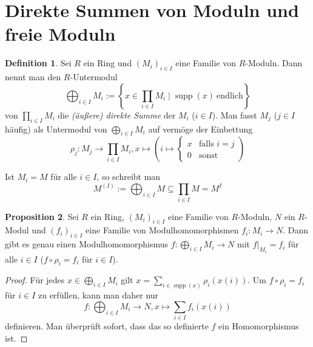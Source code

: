 \documentclass[
twoside=semi,
fontsize=12,
DIV=12, 
cleardoublepage=current,
leqno,
headings=optiontoheadandtoc, 
toc=idx
]{scrbook}
\newcommand{\brac}[1]{\left( #1 \right)}
\newcommand{\set}[1]{\left\{ #1 \right\}}
\DeclareMathOperator{\supp}{supp}
\theoremstyle{definition}
\newtheorem{definition}{Definition}[section]
\newtheorem{proposition}[definition]{Proposition}
\begin{document}
	\section{Direkte Summen von Moduln und freie Moduln}\thispagestyle{sectionstart}
	\begin{definition}\label{1.2.1}\hfill\newline
		Sei $R$ ein Ring und $(M_i)_{i \in I}$ eine Familie von $R$-Moduln. Dann nennt man den \linebreak$R$-Untermodul 
			\[\bigoplus_{i \in I} M_i := \set{x \in \prod_{i\in I}M_i \mid \supp(x)\ \mathrm{endlich} } \]
		von $\displaystyle\prod_{i\in I} M_i$ die \emph{(\"au\ss ere) direkte Summe} der $M_i$ ($i \in I$). Man fasst $M_j$ ($j \in I$ h\"aufig) als Untermodul von $\displaystyle\bigoplus_{i \in I} M_i$ auf verm\"oge der Einbettung 
		 \[\rho_j:M_j \to \prod_{i\in I} M_i, x \mapsto \brac{i \mapsto \begin{cases}
		 		x & \textrm{falls } i = j\\
		 		0 & \textrm{sonst}
		 \end{cases}}\] 
	 	
	 	\noindent Ist $M_i = M$ f\"ur alle $i \in I$, so schreibt man \[M^{(I)} := \bigoplus_{i \in I} M \subseteq \prod_{i\in I} M = M^I\]
	\end{definition}
	
	\begin{proposition}\label{1.2.2}\hfill\newline
		Sei $R$ ein Ring, $(M_i)_{i \in I}$ eine Familie von $R$-Moduln, $N$ ein $R$-Modul und $(f_i)_{i \in I}$ eine Familie von Modulhomomorphismen $f_i: M_i \to N$. Dann gibt es genau einen Modulhomomorphismus $\displaystyle f:\bigoplus_{i \in I} M_i \to N$ mit $f\big|_{M_i} = f_i$ f\"ur alle $i \in I$ ($f \circ \rho_i = f_i$ f\"ur $i \in I$).
	\end{proposition}

	\begin{proof}
		F\"ur jedes $\displaystyle x \in \bigoplus_{i \in I} M_i$ gilt $\displaystyle x = \sum_{i \in \supp(x)} \rho_i (x(i))$. Um $f \circ \rho_i = f_i$ f\"ur $i \in I$ zu erf\"ullen, kann man daher nur 
		\[f: \bigoplus_{i \in I} M_i \to N, x \mapsto \sum_{i \in I} f_i(x(i))\] 
		definieren. Man \"uberpr\"uft sofort, dass das so definierte $f$ ein Homomorphismus ist.
	\end{proof}
	
\end{document}
